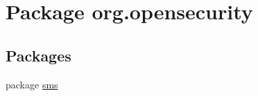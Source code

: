 \hypertarget{a00034}{\section{Package org.\+opensecurity}
\label{a00034}
}
\subsection*{Packages}
\begin{DoxyCompactItemize}
\item 
package \hyperlink{a00035}{sms}
\end{DoxyCompactItemize}
